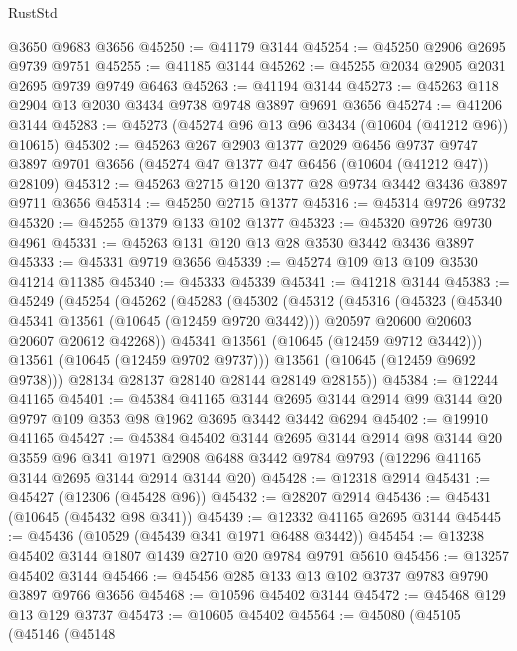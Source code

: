 \begin{lexlean}{RustStd}
\begin{coremodule}
    @3650
    @9683
    @3656
@45250 := @41179 @3144
@45254 := @45250 @2906 @2695 @9739 @9751
@45255 := @41185 @3144
@45262 := @45255 @2034 @2905 @2031 @2695 @9739 @9749 @6463
@45263 := @41194 @3144
@45273 := @45263 @118 @2904 @13 @2030 @3434 @9738 @9748 @3897 @9691 @3656
@45274 := @41206 @3144
@45283 := @45273 (@45274 @96 @13 @96 @3434 (@10604 (@41212 @96)) @10615)
@45302 := @45263
    @267
    @2903
    @1377
    @2029
    @6456
    @9737
    @9747
    @3897
    @9701
    @3656
    (@45274 @47 @1377 @47 @6456 (@10604 (@41212 @47)) @28109)
@45312 := @45263 @2715 @120 @1377 @28 @9734 @3442 @3436 @3897 @9711 @3656
@45314 := @45250 @2715 @1377
@45316 := @45314 @9726 @9732
@45320 := @45255 @1379 @133 @102 @1377
@45323 := @45320 @9726 @9730 @4961
@45331 := @45263 @131 @120 @13 @28 @3530 @3442 @3436 @3897
@45333 := @45331 @9719 @3656
@45339 := @45274 @109 @13 @109 @3530 @41214 @11385
@45340 := @45333 @45339
@45341 := @41218 @3144
@45383 := @45249
    (@45254
      (@45262
        (@45283
          (@45302
            (@45312
              (@45316
                (@45323
                  (@45340 @45341 @13561 (@10645 (@12459 @9720 @3442)))
                  @20597
                  @20600
                  @20603
                  @20607
                  @20612
                  @42268))
              @45341
              @13561
              (@10645 (@12459 @9712 @3442)))
            @13561
            (@10645 (@12459 @9702 @9737)))
          @13561
          (@10645 (@12459 @9692 @9738)))
        @28134
        @28137
        @28140
        @28144
        @28149
        @28155))
@45384 := @12244 @41165
@45401 := @45384
    @41165
    @3144
    @2695
    @3144
    @2914
    @99
    @3144
    @20
    @9797
    @109
    @353
    @98
    @1962
    @3695
    @3442
    @3442
    @6294
@45402 := @19910 @41165
@45427 := @45384
    @45402
    @3144
    @2695
    @3144
    @2914
    @98
    @3144
    @20
    @3559
    @96
    @341
    @1971
    @2908
    @6488
    @3442
    @9784
    @9793
    (@12296 @41165 @3144 @2695 @3144 @2914 @3144 @20)
@45428 := @12318 @2914
@45431 := @45427 (@12306 (@45428 @96))
@45432 := @28207 @2914
@45436 := @45431 (@10645 (@45432 @98 @341))
@45439 := @12332 @41165 @2695 @3144
@45445 := @45436 (@10529 (@45439 @341 @1971 @6488 @3442))
@45454 := @13238 @45402 @3144 @1807 @1439 @2710 @20 @9784 @9791 @5610
@45456 := @13257 @45402 @3144
@45466 := @45456 @285 @133 @13 @102 @3737 @9783 @9790 @3897 @9766 @3656
@45468 := @10596 @45402 @3144
@45472 := @45468 @129 @13 @129 @3737
@45473 := @10605 @45402
@45564 := @45080
    (@45105
      (@45146
        (@45148

\end{coremodule}
\end{lexlean}
